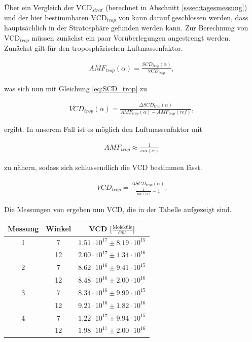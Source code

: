 \documentclass[12pt, a4paper, bibliography=totoc]{scrartcl}
\begin{document}
\begin{multicols}{2}
Über ein Vergleich der $\text{VCD}_{strat}$ (berechnet in Abschnitt \ref{sssec:tagesmessung})
und der hier bestimmbaren $\text{VCD}_{trop}$  von  kann darauf geschlossen werden, dass  hauptsächlich in der Stratosphäre gefunden werden kann.
Zur Berechnung von $\text{VCD}_{trop}$ müssen zunächst ein paar Vorüberlegungen angestrengt werden.
Zunächst gilt für den troposphärischen Luftmassenfaktor.

\begin{align}
AMF_{trop}(\alpha) = \frac{SCD_{trop}(\alpha)}{VCD_{trop}},
\end{align}

was sich nun mit Gleichung \ref{eq:SCD_trop} zu 

\begin{align}
    VCD_{trop}(\alpha) = \frac{\Delta SCD_{trop}(\alpha)}{AMF_{trop}(\alpha)-AMF_{trop}(ref)}, 
\end{align} 

ergibt.
In unserem Fall ist es möglich den Luftmassenfaktor mit

\begin{align}
AMF_{trop} \approx \frac{1}{sin(\alpha)}
\end{align}

zu nähern, sodass sich schlussendlich die VCD bestimmen lässt.

\begin{align}
VCD_{trop} = \frac{\Delta SCD_{trop}(\alpha)}{\frac{1}{\sin(\alpha)}-1}.
\end{align}

Die Messungen von  ergeben nun VCD, die in der Tabelle aufgezeigt sind.

\begin{center}
	
	\begin{tabular*}{\linewidth}{c c c}
		\toprule
		Messung & Winkel & VCD [$\frac{\text{Moleküle}}{\si{cm}^2}$] \\
		\midrule
		1 & 7 & $1.51 \cdot 10^{17} \pm 8.19 \cdot 10^{15}$  \\
		& 12 & $2.00 \cdot 10^{17} \pm 1.34 \cdot 10^{16}$\\
		2 & 7 & $8.62 \cdot 10^{16} \pm 9.41 \cdot 10^{15}$ \\
		& 12 & $8.48 \cdot 10^{16} \pm 2.00 \cdot 10^{16}$\\
		3 & 7 &  $8.34 \cdot 10^{16} \pm 9.99 \cdot 10^{15}$\\
		& 12 & $9.21 \cdot 10^{16} \pm 1.82 \cdot 10^{16}$\\
		4 & 7 & $1.22 \cdot 10^{17} \pm 9.94 \cdot 10^{15}$ \\
		& 12 & $1.98 \cdot 10^{17} \pm 2.00 \cdot 10^{16}$\\
		\bottomrule
	\end{tabular*}
	\label{fig:VCD_O3_trop}
\end{center}


\end{multicols}
\end{document}
